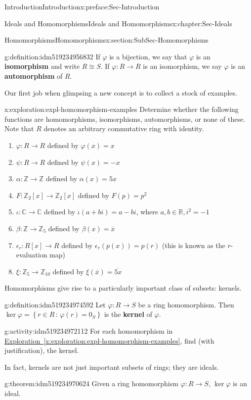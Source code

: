 \documentclass[oneside,10pt,]{book}
\newcommand{\xreffont}{\relax}
\newcommand{\terminology}[1]{\textbf{#1}}
\numberwithin{equation}{section}
\def\p{\varphi}
\newcommand{\setof}[2]{{\left\{#1\,\colon\,#2\right\}}}
\def\C{{\mathbb C}}
\def\Z{{\mathbb Z}}
\def\R{{\mathbb R}}
\begin{document}
\begin{preface}{Introduction}{}{Introduction}{}{}{x:preface:Sec-Introduction}
\begin{chapterptx}{Ideals and Homomorphisms}{}{Ideals and Homomorphisms}{}{}{x:chapter:Sec-Ideals}
\begin{sectionptx}{Homomorphisms}{}{Homomorphisms}{}{}{x:section:SubSec-Homomorphisms}
\begin{definition}{}{g:definition:idm519234956832}
If \(\p\) is a bijection, we say that \(\p\) is an \terminology{isomorphism} and write \(R\cong S\). If \(\p : R\to R\) is an isomorphism, we say \(\p\) is an \terminology{automorphism} of \(R\).%
\end{definition}
Our first job when glimpsing a new concept is to collect a stock of examples.%
\begin{exploration}{}{x:exploration:expl-homomorphism-examples}%
Determine whether the following functions are homomorphisms, isomorphisms, automorphisms, or none of these. Note that \(R\) denotes an arbitrary commutative ring with identity.%
%
\begin{enumerate}
\item{}\(\p : R\to R\) defined by \(\p(x)=x\)%
\item{}\(\psi : R\to R\) defined by \(\psi(x)=-x\)%
\item{}\(\alpha : \Z\to \Z\) defined by \(\alpha(x)=5x\)%
\item{}\(F : \Z_2[x]\to \Z_2[x]\) defined by \(F(p) = p^2\)%
\item{}\(\iota : \C\to \C\) defined by \(\iota(a+bi)=a-bi\), where \(a,b\in \R, i^2 = -1\)%
\item{}\(\beta : \Z\to \Z_{5}\) defined by \(\beta(x) = \overline{x}\)%
\item{}\(\epsilon_r : R[x] \to R\) defined by \(\epsilon_r(p(x)) = p(r)\) (this is known as the \(r\)-evaluation map)%
\item{}\(\xi : \Z_5 \to \Z_{10}\) defined by \(\xi(\overline{x}) = \overline{5x}\)%
\end{enumerate}
\end{exploration}
Homomorphisms give rise to a particularly important class of subsets: kernels.%
\begin{definition}{}{g:definition:idm519234974592}%
Let \(\p : R \to S\) be a ring homomorphism. Then \(\ker \p =\setof{r\in R}{\p(r)=0_S}\) is the \terminology{kernel} of \(\p\).%
\end{definition}
\begin{activity}{}{g:activity:idm519234972112}%
For each homomorphism in \hyperref[x:exploration:expl-homomorphism-examples]{Exploration~{\xreffont\ref{x:exploration:expl-homomorphism-examples}}}, find (with justification), the kernel.%
\end{activity}
In fact, kernels are not just important subsets of rings; they are ideals.%
\begin{theorem}{}{}{g:theorem:idm519234970624}%
Given a ring homomorphism \(\p : R\to S\), \(\ker\p\) is an ideal.%

\end{theorem}
\end{sectionptx}
\end{chapterptx}
\end{preface}
\end{document}
